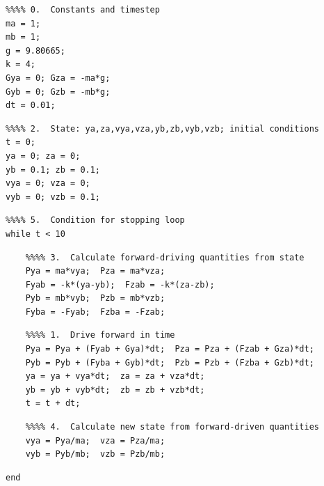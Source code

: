\documentclass[a4paper,12pt,%
onecolumn,oneside,%
british%
]{memoir}
\newcommand*{\amp}{\&}
\renewcommand*{\|}[1][]{\nonscript\:#1\vert\nonscript\:\mathopen{}}
\begin{document}
\begin{table}[p]
  \caption{Example script for numerical time integration of the spring\,\amp\,bodies system. The \textcolor{red}{constants}, \textcolor{yellow}{initial values}, and the \textcolor{midgrey}{stop condition} (stop at \qty{10}{s}) can of course be different. Vector components are declared on one line.}\label{tab:script_strategy}

\small
\begin{framed}
\color{red}\begin{verbatim}
%%%% 0.  Constants and timestep
ma = 1;
mb = 1;
g = 9.80665;
k = 4;
Gya = 0; Gza = -ma*g;
Gyb = 0; Gzb = -mb*g;
dt = 0.01;
\end{verbatim}
\vspace{-1.5\baselineskip}
\color{yellow}\begin{verbatim}
%%%% 2.  State: ya,za,vya,vza,yb,zb,vyb,vzb; initial conditions
t = 0;
ya = 0; za = 0;
yb = 0.1; zb = 0.1;
vya = 0; vza = 0;
vyb = 0; vzb = 0.1;
\end{verbatim}
\vspace{-1.5\baselineskip}
\color{midgrey}\begin{verbatim}
%%%% 5.  Condition for stopping loop
while t < 10
\end{verbatim}
\vspace{-1.5\baselineskip}
\color{blue}\begin{verbatim}
    %%%% 3.  Calculate forward-driving quantities from state
    Pya = ma*vya;  Pza = ma*vza;
    Fyab = -k*(ya-yb);  Fzab = -k*(za-zb);
    Pyb = mb*vyb;  Pzb = mb*vzb;
    Fyba = -Fyab;  Fzba = -Fzab;
\end{verbatim}
\vspace{-1.5\baselineskip}
\color{green}\begin{verbatim}
    %%%% 1.  Drive forward in time
    Pya = Pya + (Fyab + Gya)*dt;  Pza = Pza + (Fzab + Gza)*dt;
    Pyb = Pyb + (Fyba + Gyb)*dt;  Pzb = Pzb + (Fzba + Gzb)*dt;
    ya = ya + vya*dt;  za = za + vza*dt;
    yb = yb + vyb*dt;  zb = zb + vzb*dt;
    t = t + dt;
\end{verbatim}
\vspace{-1.5\baselineskip}
\color{cyan}\begin{verbatim}
    %%%% 4.  Calculate new state from forward-driven quantities
    vya = Pya/ma;  vza = Pza/ma;
    vyb = Pyb/mb;  vzb = Pzb/mb;
\end{verbatim}
\vspace{-1.5\baselineskip}
\color{midgrey}\begin{verbatim}
end
\end{verbatim}
\end{framed}
\end{table}
\end{document}
